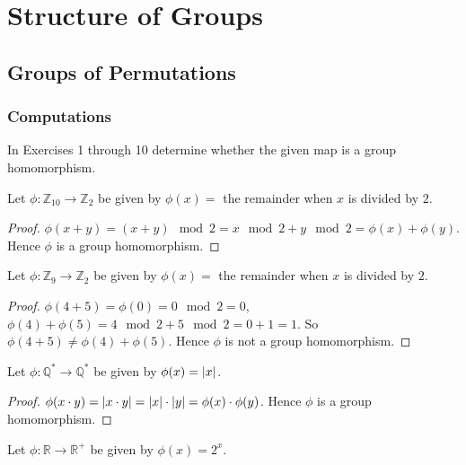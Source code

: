 \newpage
\chapter{Structure of Groups}

\newpage
\section{Groups of Permutations}

\subsection*{Computations}

In Exercises 1 through 10 determine whether the given map is a group homomorphism.

\newpage
\begin{exercise}
    Let $\phi: \mathbb{Z}_{10} \to \mathbb{Z}_{2}$ be given by $\phi(x) = $ the remainder when $x$ is divided by $2$.
\end{exercise}

\begin{proof}
    $\phi(x + y) = (x + y) \mod 2 = x \mod 2 + y \mod 2 = \phi(x) + \phi(y)$. Hence $\phi$ is a group homomorphism.
\end{proof}

\newpage
\begin{exercise}
    Let $\phi: \mathbb{Z}_{9} \to \mathbb{Z}_{2}$ be given by $\phi(x) =$ the remainder when $x$ is divided by $2$.
\end{exercise}

\begin{proof}
    $\phi(4 + 5) = \phi(0) = 0\mod 2 = 0$, $\phi(4) + \phi(5) = 4\mod 2 + 5\mod 2 = 0 + 1 = 1$. So $\phi(4 + 5) \ne \phi(4) + \phi(5)$. Hence $\phi$ is not a group homomorphism.
\end{proof}

\newpage
\begin{exercise}
    Let $\phi: \mathbb{Q}^{*} \to \mathbb{Q}^{*}$ be given by $\phi(x) = \left\vert{x}\right\vert$.
\end{exercise}

\begin{proof}
    $\phi(x\cdot y) = \left\vert{x\cdot y}\right\vert = \left\vert{x}\right\vert\cdot\left\vert{y}\right\vert = \phi(x)\cdot\phi(y)$. Hence $\phi$ is a group homomorphism.
\end{proof}

\newpage
\begin{exercise}
    Let $\phi: \mathbb{R} \to \mathbb{R}^{+}$ be given by $\phi(x) = 2^{x}$.
\end{exercise}

